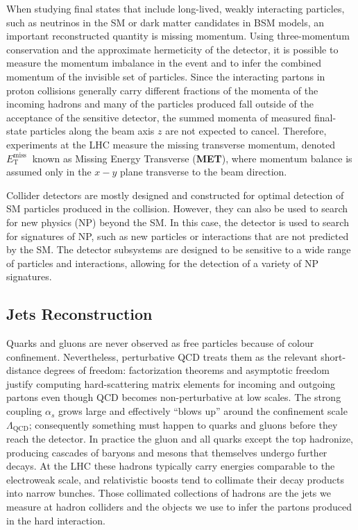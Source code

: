 When studying final states that include long-lived, weakly interacting particles, such as neutrinos in the SM or dark matter candidates in BSM models, an important reconstructed quantity is missing momentum.  Using three-momentum conservation and the approximate hermeticity of the detector, it is possible to measure the momentum imbalance in the event and to infer the combined momentum of the invisible set of particles. Since the interacting partons in proton collisions generally carry different fractions of the momenta of the incoming hadrons and many of the particles produced fall outside of the acceptance of the sensitive detector, the summed momenta of measured final-state particles along the beam axis $z$ are not expected to cancel. Therefore, experiments at the LHC measure the missing transverse momentum, denoted $E_{\mathrm{T}}^{\text {miss }}$ known as Missing Energy Transverse (\textbf{MET}), where momentum balance is assumed only in the $x-y$ plane transverse to the beam direction.

Collider detectors are mostly designed and constructed for optimal detection of SM particles produced in the collision. However, they can also be used to search for new physics (NP) beyond the SM. In this case, the detector is used to search for signatures of NP, such as new particles or interactions that are not predicted by the SM. The detector subsystems are designed to be sensitive to a wide range of particles and interactions, allowing for the detection of a variety of NP signatures.


\subsection{Jets Reconstruction}

Quarks and gluons are never observed as free particles because of colour confinement. Nevertheless, perturbative QCD treats them as the relevant short-distance degrees of freedom: factorization theorems and asymptotic freedom justify computing hard-scattering matrix elements for incoming and outgoing partons even though QCD becomes non-perturbative at low scales. The strong coupling \(\alpha_s\) grows large and effectively ``blows up'' around the confinement scale \(\Lambda_{\mathrm{QCD}}\); consequently something must happen to quarks and gluons before they reach the detector. In practice the gluon and all quarks except the top hadronize, producing cascades of baryons and mesons that themselves undergo further decays. At the LHC these hadrons typically carry energies comparable to the electroweak scale, and relativistic boosts tend to collimate their decay products into narrow bunches. Those collimated collections of hadrons are the jets we measure at hadron colliders and the objects we use to infer the partons produced in the hard interaction.

